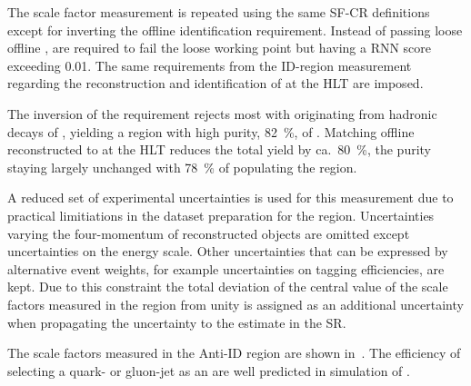The scale factor measurement is repeated using the same SF-CR
definitions except for inverting the offline \tauhadvis identification
requirement. Instead of \tauhadvis passing loose offline \tauid,
\tauhadvis are required to fail the loose working point but having a
RNN \tauid score exceeding \num{0.01}. The same requirements from the
ID-region measurement regarding the reconstruction and identification
of \tauhadvis at the HLT are imposed.

The inversion of the \tauid requirement rejects most \ttbar with
\tauhadvis originating from hadronic decays of \tauleptons, yielding a
region with high purity, \SI{82}{\percent}, of \ttbarFakes. Matching
offline reconstructed \tauhadvis to \tauhadvis at the HLT reduces the
total \ttbarFakes yield by ca.\ \SI{80}{\percent}, the purity staying
largely unchanged with \SI{78}{\percent} of \ttbarFakes populating the
\antiid region.

A reduced set of experimental uncertainties is used for this
measurement due to practical limitiations in the dataset preparation
for the \lephad \antiid region. Uncertainties varying the
four-momentum of reconstructed objects are omitted except
uncertainties on the \tauhadvis energy scale. Other uncertainties that
can be expressed by alternative event weights, for example
uncertainties on tagging efficiencies, are kept. Due to this
constraint the total deviation of the central value of the scale
factors measured in the \antiid region from unity is assigned as an
additional uncertainty when propagating the uncertainty to the
\multijet estimate in the \hadhad SR.

The scale factors measured in the Anti-ID region are shown
in~. The efficiency of selecting a quark-
or gluon-jet as an \antitau are well predicted in simulation of
\ttbar.

